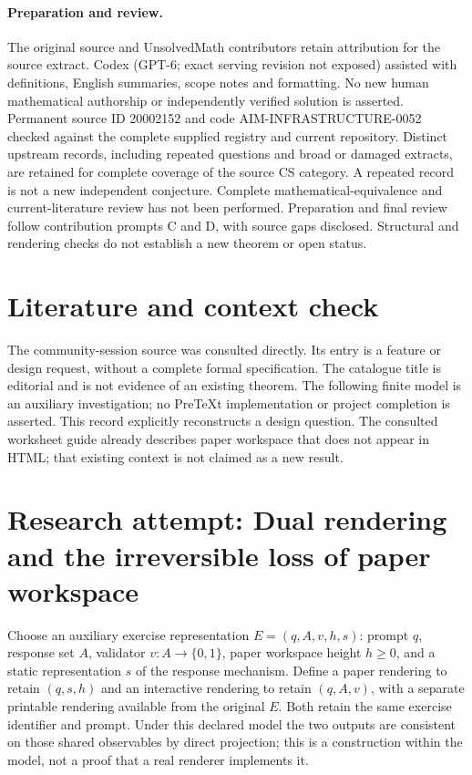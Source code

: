 \documentclass[11pt]{article}
\begin{document}
\paragraph{Preparation and review.}
The original source and UnsolvedMath contributors retain attribution for the source extract. Codex (GPT-6; exact serving revision not exposed) assisted with definitions, English summaries, scope notes and formatting. No new human mathematical authorship or independently verified solution is asserted. Permanent source ID 20002152 and code AIM-INFRASTRUCTURE-0052 checked against the complete supplied registry and current repository. Distinct upstream records, including repeated questions and broad or damaged extracts, are retained for complete coverage of the source CS category. A repeated record is not a new independent conjecture. Complete mathematical-equivalence and current-literature review has not been performed. Preparation and final review follow contribution prompts C and D, with source gaps disclosed. Structural and rendering checks do not establish a new theorem or open status.
\label{end:20002152}

\section{Literature and context check}
The community-session source was consulted directly. Its entry is a feature or design request, without a complete formal specification. The catalogue title is editorial and is not evidence of an existing theorem. The following finite model is an auxiliary investigation; no PreTeXt implementation or project completion is asserted. This record explicitly reconstructs a design question. The consulted worksheet guide already describes paper workspace that does not appear in HTML; that existing context is not claimed as a new result.
\section{Research attempt: Dual rendering and the irreversible loss of paper workspace}
Choose an auxiliary exercise representation $E=(q,A,v,h,s)$: prompt $q$, response set $A$, validator $v:A\to\{0,1\}$, paper workspace height $h\ge0$, and a static representation $s$ of the response mechanism. Define a paper rendering to retain $(q,s,h)$ and an interactive rendering to retain $(q,A,v)$, with a separate printable rendering available from the original $E$. Both retain the same exercise identifier and prompt. Under this declared model the two outputs are consistent on those shared observables by direct projection; this is a construction within the model, not a proof that a real renderer implements it.
\end{document}
